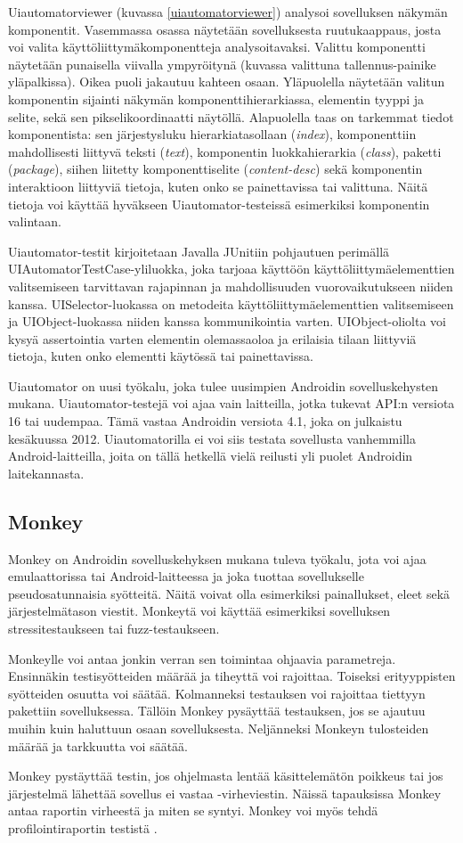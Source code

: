 Uiautomatorviewer (kuvassa \ref{uiautomatorviewer}) analysoi sovelluksen näkymän komponentit. Vasemmassa osassa näytetään sovelluksesta ruutukaappaus, josta voi valita käyttöliittymäkomponentteja analysoitavaksi. Valittu komponentti näytetään punaisella viivalla ympyröitynä (kuvassa valittuna tallennus-painike yläpalkissa). Oikea puoli jakautuu kahteen osaan. Yläpuolella näytetään valitun komponentin sijainti näkymän komponenttihierarkiassa, elementin tyyppi ja selite, sekä sen pikselikoordinaatti näytöllä. Alapuolella taas on tarkemmat tiedot komponentista: sen järjestysluku hierarkiatasollaan (\emph{index}), komponenttiin mahdollisesti liittyvä teksti (\emph{text}), komponentin luokkahierarkia (\emph{class}), paketti (\emph{package}), siihen liitetty komponenttiselite (\emph{content-desc}) sekä komponentin interaktioon liittyviä tietoja, kuten onko se painettavissa tai valittuna. Näitä tietoja voi käyttää hyväkseen Uiautomator-testeissä esimerkiksi komponentin valintaan.

Uiautomator-testit kirjoitetaan Javalla JUnitiin pohjautuen perimällä UIAutomatorTestCase-yliluokka, joka tarjoaa käyttöön käyttöliittymäelementtien valitsemiseen tarvittavan rajapinnan ja mahdollisuuden vuorovaikutukseen niiden kanssa. UISelector-luokassa on metodeita käyttöliittymäelementtien valitsemiseen ja UIObject-luokassa niiden kanssa kommunikointia varten. UIObject-oliolta voi kysyä assertointia varten elementin olemassaoloa ja erilaisia tilaan liittyviä tietoja, kuten onko elementti käytössä tai painettavissa.

Uiautomator on uusi työkalu, joka tulee uusimpien Androidin sovelluskehysten mukana. Uiautomator-testejä voi ajaa vain laitteilla, jotka tukevat API:n versiota 16 tai uudempaa. Tämä vastaa Androidin versiota 4.1, joka on julkaistu kesäkuussa 2012. Uiautomatorilla ei voi siis testata sovellusta vanhemmilla Android-laitteilla, joita on tällä hetkellä vielä reilusti yli puolet Androidin laitekannasta.

\subsection{Monkey}

Monkey \cite{monkey} on Androidin sovelluskehyksen mukana tuleva työkalu, jota voi ajaa emulaattorissa tai Android-laitteessa ja joka tuottaa sovellukselle pseudosatunnaisia syötteitä. Näitä voivat olla esimerkiksi painallukset, eleet sekä järjestelmätason viestit. Monkeytä voi käyttää esimerkiksi sovelluksen stressitestaukseen tai fuzz-testaukseen.

Monkeylle voi antaa jonkin verran sen toimintaa ohjaavia parametreja. Ensinnäkin testisyötteiden määrää ja tiheyttä voi rajoittaa. Toiseksi erityyppisten syötteiden osuutta voi säätää. Kolmanneksi testauksen voi rajoittaa tiettyyn pakettiin sovelluksessa. Tällöin Monkey pysäyttää testauksen, jos se ajautuu muihin kuin haluttuun osaan sovelluksesta. Neljänneksi Monkeyn tulosteiden määrää ja tarkkuutta voi säätää.

Monkey pystäyttää testin, jos ohjelmasta lentää käsittelemätön poikkeus tai jos järjestelmä lähettää sovellus ei vastaa -virheviestin. Näissä tapauksissa Monkey antaa raportin virheestä ja miten se syntyi. Monkey voi myös tehdä profilointiraportin testistä .